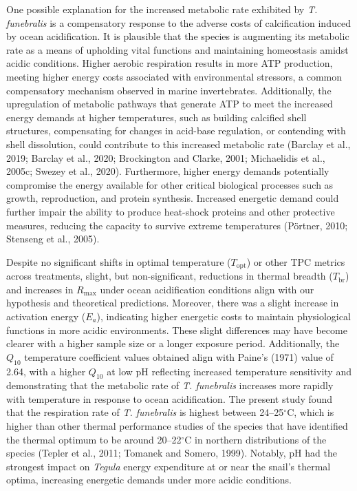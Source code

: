 \documentclass{CSUNthesis}
\begin{document}
One possible explanation for the increased metabolic rate exhibited by \textit{T. funebralis} is a compensatory response to the adverse costs of calcification induced by ocean acidification. It is plausible that the species is augmenting its metabolic rate as a means of upholding vital functions and maintaining homeostasis amidst acidic conditions. Higher aerobic respiration results in more ATP production, meeting higher energy costs associated with environmental stressors, a common compensatory mechanism observed in marine invertebrates. Additionally, the upregulation of metabolic pathways that generate ATP to meet the increased energy demands at higher temperatures, such as building calcified shell structures, compensating for changes in acid-base regulation, or contending with shell dissolution, could contribute to this increased metabolic rate (Barclay et al., 2019; Barclay et al., 2020; Brockington and Clarke, 2001; Michaelidis et al., 2005c; Swezey et al., 2020). Furthermore, higher energy demands potentially compromise the energy available for other critical biological processes such as growth, reproduction, and protein synthesis. Increased energetic demand could further impair the ability to produce heat-shock proteins and other protective measures, reducing the capacity to survive extreme temperatures (Pörtner, 2010; Stenseng et al., 2005).

Despite no significant shifts in optimal temperature (\(T_{\text{opt}}\)) or other TPC metrics across treatments, slight, but non-significant, reductions in thermal breadth (\(T_{\text{br}}\)) and increases in \(R_{\text{max}}\) under ocean acidification conditions align with our hypothesis and theoretical predictions. Moreover, there was a slight increase in activation energy (\(E_a\)), indicating higher energetic costs to maintain physiological functions in more acidic environments. These slight differences may have become clearer with a higher sample size or a longer exposure period. Additionally, the \(Q_{10}\) temperature coefficient values obtained align with Paine's (1971) value of 2.64, with a higher \(Q_{10}\) at low pH reflecting increased temperature sensitivity and demonstrating that the metabolic rate of \textit{T. funebralis} increases more rapidly with temperature in response to ocean acidification. The present study found that the respiration rate of \textit{T. funebralis} is highest between 24--25\(^\circ\)C, which is higher than other thermal performance studies of the species that have identified the thermal optimum to be around 20--22\(^\circ\)C in northern distributions of the species (Tepler et al., 2011; Tomanek and Somero, 1999). Notably, pH had the strongest impact on \textit{Tegula} energy expenditure at or near the snail's thermal optima, increasing energetic demands under more acidic conditions.
\end{document}
